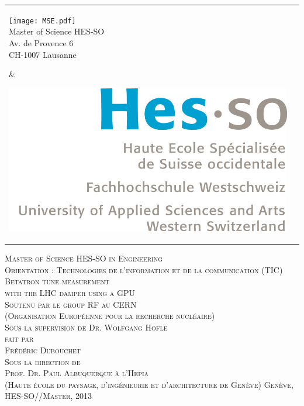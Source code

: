 
\begin{titlepage}

\begin{flushleft}
\begin{tabular}{lr}
    \parbox{8.5cm}{
    	\texttt{[image: MSE.pdf]}\\
    	\small Master of Science HES-SO\\
		\small Av. de Provence 6\\
		\small CH-1007 Lausanne
	} &
    \parbox{4cm}{
    	\includegraphics[scale=0.1]{HESSO.jpg}
    } \\[3cm]
\end{tabular}
\end{flushleft}

\begin{flushright}
\textsc{\Large Master of Science HES-SO in Engineering} \\[0.2cm]
\textsc{\small Orientation : Technologies de l'information et de la communication (TIC)}\\[1cm]
\textsc{\LARGE Betatron tune measurement \\[0.3cm] with the LHC damper using a GPU} \\ [1cm]
\textsc{\small Soutenu par le group RF au CERN}\\ 
\textsc{\small (Organisation Europ{\'e}enne pour la recherche nucl{\'e}aire)}\\
\textsc{\small Sous la supervision de Dr. Wolfgang H{\"o}f\/le} \\[2cm]
\textsc{\small fait par} \\
\textsc{\Large Fr{\'e}d{\'e}ric Dubouchet} \\[2cm]
\textsc{\small Sous la direction de}\\
\textsc{\small Prof. Dr. Paul Albuquerque}
\textsc{\small {\`a} l'Hepia}\\
\textsc{\small (Haute {\'e}cole du paysage, d'ing{\'e}nieurie et d'architecture de Gen{\`e}ve)}
\vfill %
\textsc{\small Gen{\`e}ve, HES-SO//Master, 2013}
\end{flushright}

\end{titlepage}

